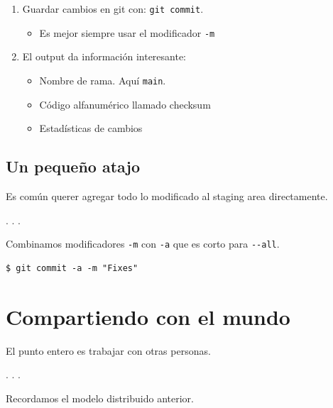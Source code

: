 \begin{enumerate}
\def\labelenumi{\arabic{enumi}.}
\tightlist
\item
  Guardar cambios en git con: \passthrough{\lstinline!git commit!}.

  \begin{itemize}
  \tightlist
  \item
    Es mejor siempre usar el modificador \passthrough{\lstinline!-m!}
  \end{itemize}
\item
  El output da información interesante:

  \begin{itemize}
  \tightlist
  \item
    Nombre de rama. Aquí \passthrough{\lstinline!main!}.
  \item
    Código alfanumérico llamado checksum
  \item
    Estadísticas de cambios
  \end{itemize}
\end{enumerate}

\subsection{Un pequeño atajo}

Es común querer agregar todo lo modificado al staging area directamente.

. . .

Combinamos modificadores \passthrough{\lstinline!-m!} con
\passthrough{\lstinline!-a!} que es corto para
\passthrough{\lstinline!--all!}.

\begin{lstlisting}
$ git commit -a -m "Fixes"
\end{lstlisting}

\section{Compartiendo con el mundo}

El punto entero es trabajar con otras personas.

. . .

Recordamos el modelo distribuido anterior.

\subsection{}

